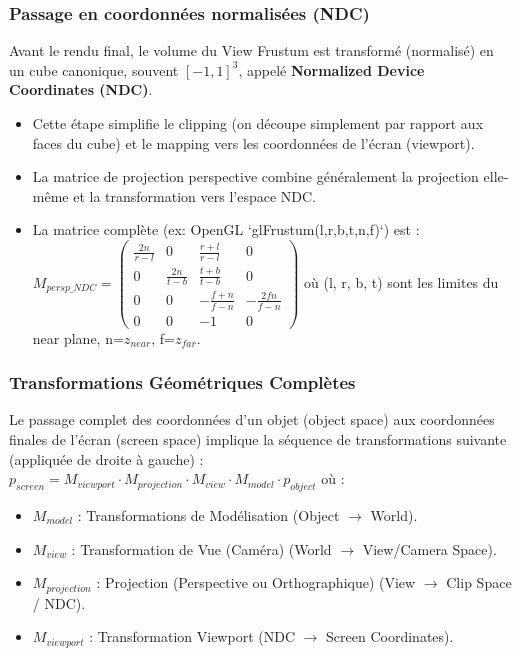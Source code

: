 \documentclass{article}
\begin{document}
\subsubsection{Passage en coordonnées normalisées (NDC)}
Avant le rendu final, le volume du View Frustum est transformé (normalisé) en un cube canonique, souvent $[-1, 1]^3$, appelé \textbf{Normalized Device Coordinates (NDC)}.
\begin{itemize}
    \item Cette étape simplifie le clipping (on découpe simplement par rapport aux faces du cube) et le mapping vers les coordonnées de l'écran (viewport).
    \item La matrice de projection perspective combine généralement la projection elle-même et la transformation vers l'espace NDC.
    \item La matrice complète (ex: OpenGL `glFrustum(l,r,b,t,n,f)`) est :
    $M_{persp\_NDC} = \begin{pmatrix} \frac{2n}{r-l} & 0 & \frac{r+l}{r-l} & 0 \\ 0 & \frac{2n}{t-b} & \frac{t+b}{t-b} & 0 \\ 0 & 0 & -\frac{f+n}{f-n} & -\frac{2fn}{f-n} \\ 0 & 0 & -1 & 0 \end{pmatrix}$
    où (l, r, b, t) sont les limites du near plane, n=$z_{near}$, f=$z_{far}$.
\end{itemize}

\subsubsection{Transformations Géométriques Complètes}
Le passage complet des coordonnées d'un objet (object space) aux coordonnées finales de l'écran (screen space) implique la séquence de transformations suivante (appliquée de droite à gauche) :
$p_{screen} = M_{viewport} \cdot M_{projection} \cdot M_{view} \cdot M_{model} \cdot p_{object}$
où :
\begin{itemize}
    \item $M_{model}$ : Transformations de Modélisation (Object $\to$ World).
    \item $M_{view}$ : Transformation de Vue (Caméra) (World $\to$ View/Camera Space).
    \item $M_{projection}$ : Projection (Perspective ou Orthographique) (View $\to$ Clip Space / NDC).
    \item $M_{viewport}$ : Transformation Viewport (NDC $\to$ Screen Coordinates).
\end{itemize}
\end{document}
